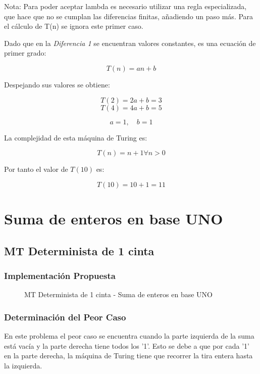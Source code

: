\documentclass{uc3mpracticas}
\begin{document}
    Nota: Para poder aceptar lambda es necesario utilizar una regla especializada, que hace que no se cumplan las diferencias finitas, añadiendo un paso más. Para el cálculo de T(n) se ignora este primer caso.

    \vspace{2mm}

    Dado que en la \textit{Diferencia 1} se encuentran valores constantes, es una ecuación de primer grado:


    $$ T(n) = an+ b $$

    Despejando sus valores se obtiene:

    $$ T(2) = 2a + b = 3 $$
    $$ T(4) = 4a + b = 5 $$

    $$ a = 1 , \quad b = 1$$

    La complejidad de esta máquina de Turing es:

    $$ T(n) = n + 1 \forall n>0 $$

    Por tanto el valor de $T(10)$ es:

    $$ T(10) = 10 + 1 = 11 $$




  \newpage

  \section{Suma de enteros en base UNO}



  \subsection{MT Determinista de 1 cinta}

  \subsubsection{Implementación Propuesta}

  \begin{figure}[!h]
    \caption{MT Determinista de 1 cinta - Suma de enteros en base UNO}
  \end{figure}


  \subsubsection{Determinación del Peor Caso}

  En este problema el peor caso se encuentra cuando la parte izquierda de la suma está vacía y la parte derecha tiene todos los '1'. Esto se debe a que por cada '1' en la parte derecha, la máquina de Turing tiene que recorrer la tira entera hasta la izquierda.
\end{document}
